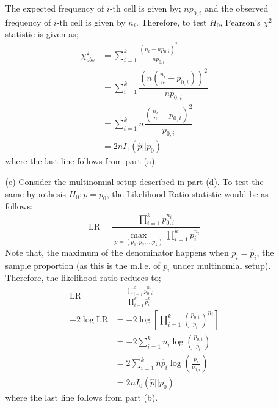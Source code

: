 \documentclass[12pt]{article}
\begin{document}
\begin{enumerate}
\begin{solution}
\begin{enumerate}
	The expected frequency of $i$-th cell is given by; $np_{0,i}$ and the observed frequency of $i$-th cell is given by $n_i$. Therefore, to test $H_0$, Pearson's $\chi^2$ statistic is given as;
	\begin{align*}
		\chi^2_{obs} & = \sum_{i=1}^{k} \frac{(n_i - np_{0,i})^2}{np_{0,i}}\\
		& = \sum_{i=1}^{k} \dfrac{\left(n\left(\frac{n_i}{n} - p_{0,i}\right)\right)^2}{np_{0,i}}\\
		& = \sum_{i=1}^{k} n\dfrac{\left(\frac{n_i}{n} - p_{0,i}\right)^2}{p_{0,i}}\\
		& = 2nI_1\left(\hat{p} || p_0\right)
	\end{align*}
	 where the last line follows from part (a).
	 
	\item[(e)] Consider the multinomial setup described in part (d). To test the same hypothesis $H_0 : p=p_0$, the Likelihood Ratio statistic would be as follows;
	$$\text{LR} = \dfrac{\prod_{i=1}^{k}p_{0,i}^{n_i}}{\max_{p=(p_1,p_2,\dots p_k)} \prod_{i=1}^{k}p_i^{n_i}}$$
	Note that, the maximum of the denominator happens when $p_i = \hat{p}_i$, the sample proportion (as this is the m.l.e. of $p_i$ under multinomial setup). Therefore, the likelihood ratio reduces to;
	\begin{align*}
		\text{LR} & = \frac{\prod_{i=1}^{k}p_{0,i}^{n_i}}{\prod_{i=1}^{k}\hat{p}_i^{n_i}}\\
		-2\log\text{LR} & = -2\log\left[\prod_{i=1}^{k}\left(\frac{p_{0,i}}{\hat{p}_i}\right)^{n_i}\right]\\
		& = -2\sum_{i=1}^{k}n_i\log\left(\frac{p_{0,i}}{\hat{p}_i}\right)\\
		& = 2\sum_{i=1}^{k}n\hat{p}_i\log\left(\frac{\hat{p}_i}{p_{0,i}}\right)\\
		& = 2nI_0\left(\hat{p} || p_0\right)
	\end{align*}
	where the last line follows from part (b).
	

\end{enumerate}
\end{solution}
\end{enumerate}
\end{document}

